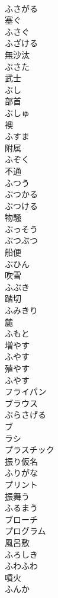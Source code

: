 \documentclass[8pt]{extreport}
\begin{document}
\begin{CJK}{UTF8}{min}
\\	ふさがる	
\\	塞ぐ 
\\	ふさぐ	
\\	ふざける	
\\	無沙汰 
\\	ぶさた	
\\	武士 
\\	ぶし	
\\	部首 
\\	ぶしゅ	
\\	襖 
\\	ふすま	
\\	附属 
\\	ふぞく	
\\	不通 
\\	ふつう	
\\	ぶつかる	
\\	ぶつける	
\\	物騒 
\\	ぶっそう	
\\	ぶつぶつ	
\\	船便 
\\	ぶひん	
\\	吹雪 
\\	ふぶき	
\\	踏切 
\\	ふみきり	
\\	麓 
\\	ふもと	
\\	増やす 
\\	ふやす	
\\	殖やす 
\\	ふやす	
\\	フライパン	
\\	ブラウス	
\\	ぶらさげる	
\\	ブ 
\\	ラシ	
\\	プラスチック	
\\	振り仮名 
\\	ふりがな	
\\	プリント	
\\	振舞う 
\\	ふるまう	
\\	ブローチ	
\\	プログラム	
\\	風呂敷 
\\	ふろしき	
\\	ふわふわ	
\\	噴火 
\\	ふんか	

\end{CJK}
\end{document}
